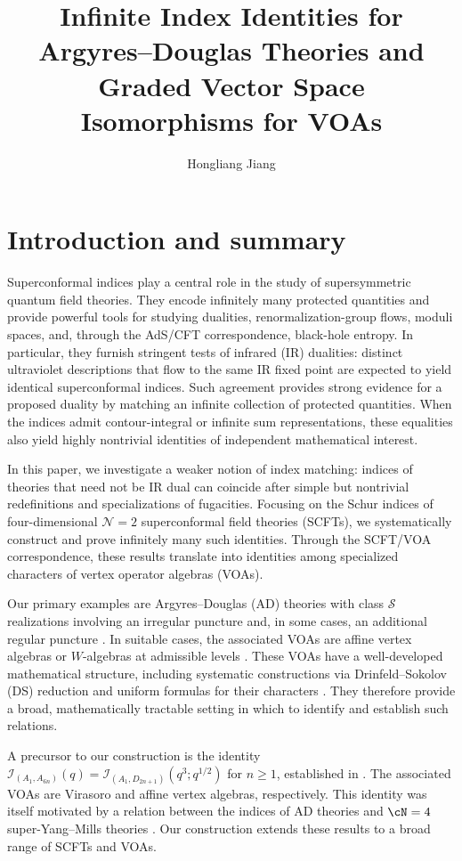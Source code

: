 \documentclass[a4paper,11pt]{article}
\author[a,b ]{Hongliang Jiang}
\affiliation[a]{Center for Mathematics and Interdisciplinary Sciences, Fudan University, Shanghai 200433, China }
\affiliation[b]{Shanghai Institute for Mathematics and Interdisciplinary Sciences (SIMIS), Shanghai 200433, China}
\title{\Large Infinite    Index Identities for Argyres--Douglas Theories and  
Graded Vector Space Isomorphisms for VOAs }%
\theoremstyle{definition}
\theoremstyle{definition}
\theoremstyle{remark}
\begin{document}
 
\maketitle
\raggedbottom


\section{Introduction and summary}

Superconformal indices    play a central role in the study of supersymmetric quantum field theories. They encode infinitely many protected quantities and provide powerful tools for studying dualities, renormalization-group flows, moduli spaces, and, through the AdS/CFT correspondence, black-hole entropy. In particular, they furnish stringent tests of infrared (IR) dualities: distinct ultraviolet descriptions that flow to the same IR fixed point are expected to yield identical superconformal indices. Such agreement provides strong evidence for a proposed duality by matching an infinite collection of protected quantities. When the indices admit contour-integral or infinite sum representations, these equalities also yield highly nontrivial   identities of independent mathematical interest.

In this paper, we investigate a weaker notion of index matching: indices of theories that need not be IR dual can coincide after simple but nontrivial redefinitions and specializations of fugacities. Focusing on the Schur indices of four-dimensional $\mathcal{N}=2$ superconformal field theories (SCFTs), we systematically construct and prove infinitely many such identities. Through the SCFT/VOA correspondence, these results translate into identities among specialized   characters of vertex operator algebras (VOAs).

Our primary examples are Argyres--Douglas (AD) theories with class $\mathcal{S}$ realizations involving an irregular puncture and, in some cases, an additional regular puncture \cite{Xie:2012hs}. In suitable cases, the associated VOAs are affine vertex algebras or $W$-algebras at admissible levels \cite{Song:2017oew}. These VOAs have a well-developed mathematical structure, including systematic constructions via Drinfeld--Sokolov (DS) reduction and uniform formulas for their characters \cite{Bouwknegt:1992wg,FrenkelKacWakimoto1992,KacWakimotoBoundary2017}. They therefore provide a broad, mathematically tractable setting in which to identify and establish such relations.

A precursor to our construction is the identity $\mathcal I_{(A_1,A_{6n})}(q)=\mathcal I_{(A_1,D_{2n+1})}(q^3;q^{1/2})$ for $n\ge 1$, established in \cite{Adamovic:2025efe}. The associated VOAs are Virasoro and affine vertex algebras, respectively. This identity was itself motivated by a relation between the indices of AD theories and $\cN=4$ super-Yang--Mills theories \cite{Buican:2020moo,Jiang:2024baj}. Our construction extends these results to a broad range of SCFTs and VOAs.
\end{document}
